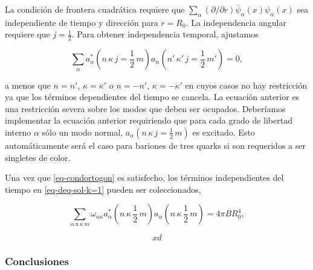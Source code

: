 La condición de frontera cuadrática requiere que $\sum_{\alpha} (\partial / \partial r) \bar{\psi}_{\alpha} (x) {\psi}_{\alpha}(x)$ sea independiente de tiempo y dirección para $r={R}_{0}$. La independencia angular requiere que $j = \frac{1}{2}$. Para obtener independencia temporal, ajustamos

\begin{equation}\label{eq-condortogon}
\sum_{\alpha} {a}_{\alpha}^{*} (n \, \kappa \, j= \frac{1}{2} \, m) {a}_{\alpha} (n' \, \kappa' \, j= \frac{1}{2} \, m') = 0,
\end{equation}

a menos que $n = n'$, $\kappa = \kappa'$ o $n = -n'$, $\kappa = -\kappa'$ en cuyos casos no hay restricción ya que los términos dependientes del tiempo se cancela. La ecuación anterior es una restricción severa sobre los modos que deben ser ocupados. Deberíamos implementar la ecuación anterior requiriendo que para cada grado de libertad interno $\alpha$ sólo un modo normal, ${a}_{\alpha}(n \, \kappa \, j = \frac{1}{2} \, m)$ es excitado. Esto automáticamente será el caso para bariones de tres quarks si son requeridos a ser singletes de color.

Una vez que \eqref{eq-condortogon} es satisfecho, los términos independientes del tiempo en \eqref{eq-deq-sol-k=1} pueden ser coleccionados,

\begin{equation}
\sum_{\alpha \, n \, \kappa \, m} {\omega}_{n \kappa} {a}_{\alpha}^{*}(n \, \kappa \, \frac{1}{2} \, m) {a}_{\alpha}(n \, \kappa \, \frac{1}{2} \, m) = 4 \pi B {R}_{0}^{4},
\end{equation}

\begin{equation}
xd
\end{equation}


\subsubsection*{Conclusiones}

